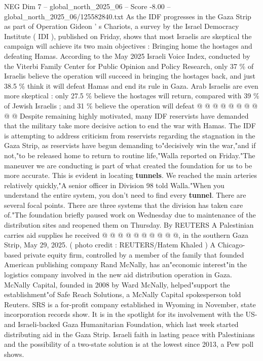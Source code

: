 \begin{textsample}{NEG Dim 7 – global\_north\_2025\_06 – Score -8.00 – global\_north\_2025\_06/125582840.txt}
As the IDF progresses in the Gaza Strip as part of Operation Gideon ' s Chariots, a survey by the Israel Democracy Institute ( IDI ), published on Friday, shows that most Israelis are skeptical the campaign will achieve its two main objectives : Bringing home the hostages and defeating Hamas.
According to the May 2025 Israeli Voice Index, conducted by the Viterbi Family Center for Public Opinion and Policy Research, only 37 \% of Israelis believe the operation will succeed in bringing the hostages back, and just 38.5 \% think it will defeat Hamas and end its rule in Gaza.
Arab Israelis are even more skeptical : only 27.5 \% believe the hostages will return, compared with 39 \% of Jewish Israelis ; and 31 \% believe the operation will defeat @ @ @ @ @ @ @ @ @ @ Despite remaining highly motivated, many IDF reservists have demanded that the military take more decisive action to end the war with Hamas.
The IDF is attempting to address criticism from reservists regarding the stagnation in the Gaza Strip, as reservists have begun demanding to"decisively win the war,"and if not,"to be released home to return to routine life,"Walla reported on Friday."The maneuver we are conducting is part of what created the foundation for us to be more accurate.
This is evident in locating \textbf{tunnels}.
We reached the main arteries relatively quickly,"A senior officer in Division 98 told Walla."When you understand the entire system, you don't need to find every \textbf{tunnel}.
There are several focal points.
There are three systems that the division has taken care of."The foundation briefly paused work on Wednesday due to maintenance of the distribution sites and reopened them on Thursday.
By REUTERS A Palestinian carries aid supplies he received @ @ @ @ @ @ @ @ @ @, in the southern Gaza Strip, May 29, 2025. ( photo credit : REUTERS/Hatem Khaled ) A Chicago-based private equity firm, controlled by a member of the family that founded American publishing company Rand McNally, has an"economic interest"in the logistics company involved in the new aid distribution operation in Gaza.
McNally Capital, founded in 2008 by Ward McNally, helped"support the establishment"of Safe Reach Solutions, a McNally Capital spokesperson told Reuters.
SRS is a for-profit company established in Wyoming in November, state incorporation records show.
It is in the spotlight for its involvement with the US- and Israeli-backed Gaza Humanitarian Foundation, which last week started distributing aid in the Gaza Strip.
Israeli faith in lasting peace with Palestinians and the possibility of a two-state solution is at the lowest since 2013, a Pew poll shows.

\end{textsample}
